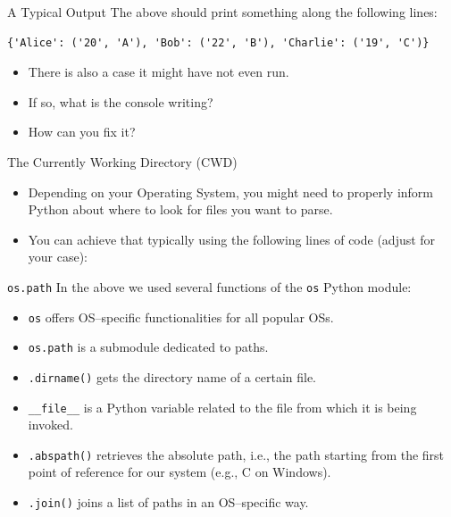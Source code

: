 \documentclass[aspectratio=169, 12pt, xcolor=table]{beamer}
\begin{document}
	\begin{frame}[fragile]{A Typical Output}
		The above should print something along the following lines:
		\begin{lstlisting}
{'Alice': ('20', 'A'), 'Bob': ('22', 'B'), 'Charlie': ('19', 'C')}
\end{lstlisting}\pause
		\begin{itemize}
			\item There is also a case it might have not even run.\pause
			\item If so, what is the console writing?\pause
			\item How can you fix it?
		\end{itemize}
	\end{frame}

	\begin{headsup}{The Currently Working Directory (CWD)}
		\begin{itemize}
			\item Depending on your Operating System, you might need to properly inform Python about where to look for files you want to parse.
			\item You can achieve that typically using the following lines of code (adjust for your case):
			
		\end{itemize}
	\end{headsup}

	\begin{headsup}{\texttt{os.path}}
		In the above we used several functions of the \texttt{os} Python module:
		\begin{itemize}
			\item \texttt{os} offers OS--specific functionalities for all popular OSs.
			\item \texttt{os.path} is a submodule dedicated to paths.
			\item \texttt{.dirname()} gets the directory name of a certain file.
			\item \texttt{\_\_file\_\_} is a Python variable related to the file from which it is being invoked.
			\item \texttt{.abspath()} retrieves the absolute path, i.e., the path starting from the first point of reference for our system (e.g., C on Windows).
			\item \texttt{.join()} joins a list of paths in an OS--specific way.
		\end{itemize}
	\end{headsup}
\end{document}
